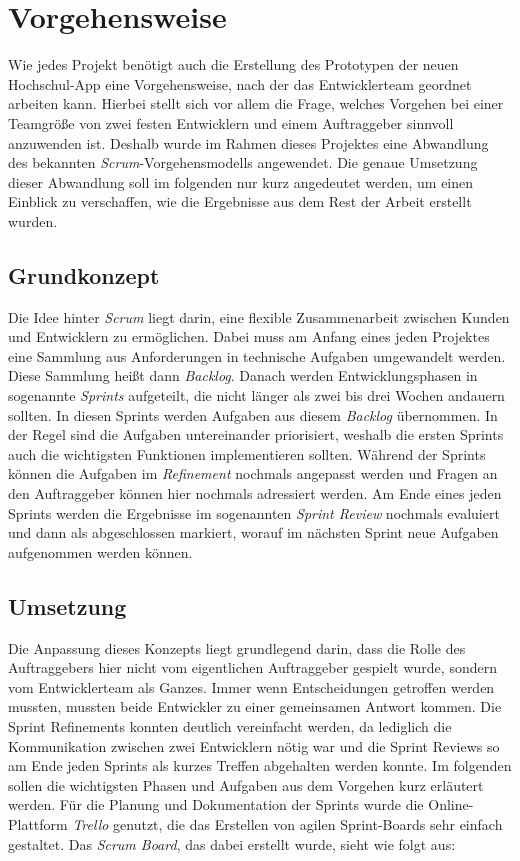 \chapter{Vorgehensweise}
\label{sec:vorgehensweise}

Wie jedes Projekt benötigt auch die Erstellung des Prototypen der neuen Hochschul-\ac{App} eine Vorgehensweise, nach der das Entwicklerteam geordnet arbeiten kann. Hierbei stellt sich vor allem die Frage, welches Vorgehen bei einer Teamgröße von zwei festen Entwicklern und einem Auftraggeber sinnvoll anzuwenden ist. Deshalb wurde im Rahmen dieses Projektes eine Abwandlung des bekannten \textit{Scrum}-Vorgehensmodells angewendet. Die genaue Umsetzung dieser Abwandlung soll im folgenden nur kurz angedeutet werden, um einen Einblick zu verschaffen, wie die Ergebnisse aus dem Rest der Arbeit erstellt wurden.

\section{Grundkonzept}

Die Idee hinter \textit{Scrum} liegt darin, eine flexible Zusammenarbeit zwischen Kunden und Entwicklern zu ermöglichen. Dabei muss am Anfang eines jeden Projektes eine Sammlung aus Anforderungen in technische Aufgaben umgewandelt werden. Diese Sammlung heißt dann \textit{Backlog}. Danach werden Entwicklungsphasen in sogenannte \textit{Sprints} aufgeteilt, die nicht länger als zwei bis drei Wochen andauern sollten. In diesen Sprints werden Aufgaben aus diesem \textit{Backlog} übernommen. In der Regel sind die Aufgaben untereinander priorisiert, weshalb die ersten Sprints auch die wichtigsten Funktionen implementieren sollten. Während der Sprints können die Aufgaben im \textit{Refinement} nochmals angepasst werden und Fragen an den Auftraggeber können hier nochmals adressiert werden. Am Ende eines jeden Sprints werden die Ergebnisse im sogenannten \textit{Sprint Review} nochmals evaluiert und dann als abgeschlossen markiert, worauf im nächsten Sprint neue Aufgaben aufgenommen werden können.

\section{Umsetzung}

Die Anpassung dieses Konzepts liegt grundlegend darin, dass die Rolle des Auftraggebers hier nicht vom eigentlichen Auftraggeber gespielt wurde, sondern vom Entwicklerteam als Ganzes. Immer wenn Entscheidungen getroffen werden mussten, mussten beide Entwickler zu einer gemeinsamen Antwort kommen. Die Sprint Refinements konnten deutlich vereinfacht werden, da lediglich die Kommunikation zwischen zwei Entwicklern nötig war und die Sprint Reviews so am Ende jeden Sprints als kurzes Treffen abgehalten werden konnte. Im folgenden sollen die wichtigsten Phasen und Aufgaben aus dem Vorgehen kurz erläutert werden. Für die Planung und Dokumentation der Sprints wurde die Online-Plattform \textit{Trello} genutzt, die das Erstellen von agilen Sprint-Boards sehr einfach gestaltet\autocite[][]{trello}. Das \textit{Scrum Board}, das dabei erstellt wurde, sieht wie folgt aus:

